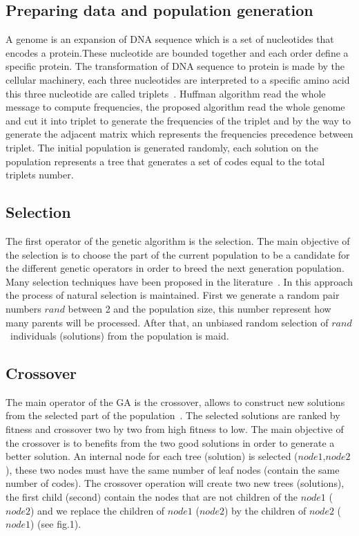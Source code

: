 \documentclass[preprint,12pt]{elsarticle}
\begin{document}
\subsection{Preparing data and population generation}
A genome is an expansion of DNA sequence which is a set of nucleotides that encodes a protein.These nucleotide are bounded together and each order define a specific protein. The transformation of DNA sequence to protein  is made by the cellular machinery, each three nucleotides are interpreted to a specific amino acid this three nucleotide are called triplets~\cite{Harvey00}. Huffman algorithm read the whole message to compute frequencies, the proposed algorithm read the whole genome and cut it into triplet to generate the frequencies of the triplet and by the way to generate the adjacent matrix which represents the frequencies precedence between triplet. The initial population is generated randomly, each solution on the population represents a tree that generates a set of codes equal to the total triplets number.
\subsection{Selection}
The first operator of the genetic algorithm is the selection. The main objective of the selection is to choose the part of the current  population to be a candidate for the different genetic operators in order to breed the next generation population. Many selection techniques have been proposed in the literature~\cite{bli95}. In this approach the  process of natural selection is maintained. First we generate a random pair numbers \textit{$rand$} between 2 and the population size, this number represent how many parents will be processed. After that, an unbiased random selection of \textit{$rand$}~individuals (solutions) from the population is maid. 
\subsection{Crossover}
The main operator of the GA is the crossover, allows to construct new solutions from the selected part of the population~\cite{osa14}. The selected solutions are ranked by fitness and crossover two by two from high fitness to low. The main objective of the crossover is to benefits from the two good solutions in order to generate a better solution. An internal node for each tree (solution) is selected (\textit{$node1$},\textit{$node2$}), these two nodes must have the same number of leaf nodes (contain the same number of codes). The crossover operation will create two new trees (solutions), the first child (second) contain the nodes that are not children of the \textit{$node1$} (\textit{$node2$}) and we replace the children of \textit{$node1$} (\textit{$node2$}) by the children of \textit{$node2$} (\textit{$node1$}) (see fig.1). 
\end{document}
